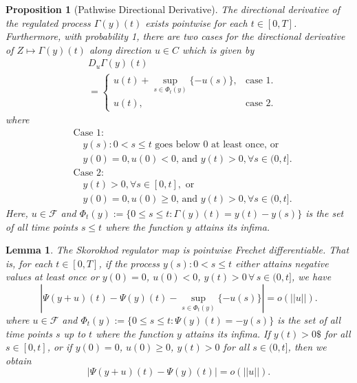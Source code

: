 \documentclass[11pt,leqno]{amsart}
\newtheorem{lemma}{Lemma}
\newtheorem{proposition}{Proposition}
\begin{document}
\begin{proposition}[Pathwise Directional Derivative]\label{prop:Sko-pathwise}
The directional derivative of the regulated process $\Gamma(y)(t)$ exists pointwise for each $t \in [0,T]$. Furthermore, with probability 1, there are two cases for the directional derivative of $Z\mapsto\Gamma(y)(t)$ along direction $u\in C$ which is given by
\begin{align*}
&D_u\Gamma(y)(t)\\
&=\begin{cases}
u(t) + \sup_{s\in \Phi_t(y)} \{-u(s)\}, &\text{case 1}.\\
u(t), &\text{case 2}.
\end{cases}
\end{align*}
where 
\begin{align*}
    &\text{Case 1:} \\
    &\quad y(s): 0 < s \leq t \text{ goes below } 0\text{ at least once, or} \\
    &\quad y(0) = 0, u(0) < 0 \text{, and } y(t) > 0, \forall s \in (0,t]. \\
    &\text{Case 2:} \\
    &\quad y(t) > 0, \forall s \in [0,t], \text{ or} \\
    &\quad y(0) = 0, u(0) \geq 0\text{, and } y(t) > 0, \forall s \in (0,t]. 
\end{align*}
Here, $u\in\mathcal{F}$ and $\Phi_t(y):= \{0\leq s \leq t : \Gamma(y)(t) = y(t)-y(s)\}$ is the set of all time points $s\leq t$ where the function $y$ attains its infima.
\end{proposition}




\begin{lemma}\label{lem:5.2}
The Skorokhod regulator map is pointwise Frechet differentiable. That is, for each $t\in[0,T]$, if the process $y(s):0< s\leq t$ either attains negative values at least once or $y(0)=0$, $u(0)< 0$, $y(t)>0\,\forall \,s\in(0,t]$, we have
$$|\Psi(y+u)(t)-\Psi(y)(t)-\sup_{s\in\Phi_t(y)}\{-u(s)\}|=o(||u||).$$
where $u\in\mathcal{F}$ and $\Phi_t(y) := \{0\leq s \leq t : \Psi(y)(t) = -y(s)\}$ is the set of all time points $s$ up to $t$ where the function $y$ attains its infima.
If $y(t)>0\$$ for all $s\in[0,t]$, or if $y(0)=0$, $u(0)\geq 0$, $y(t)>0$ for all $s\in(0,t]$, then we obtain
$$|\Psi(y+u)(t)-\Psi(y)(t)|=o(||u||).$$
\end{lemma}
\end{document}
